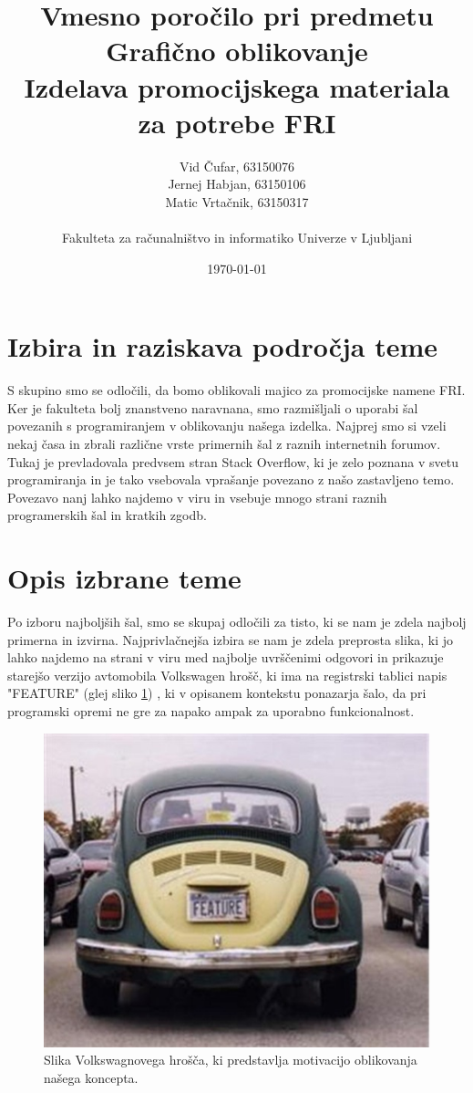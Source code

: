 \documentclass[11pt,a4paper]{article}
\title{Vmesno poročilo pri predmetu Grafično oblikovanje \\
\large Izdelava promocijskega materiala za potrebe FRI}
\author{Vid Čufar, 63150076 \\
Jernej Habjan, 63150106  \\
Matic Vrtačnik, 63150317 \\
\ \\
Fakulteta za računalništvo in informatiko Univerze v Ljubljani
\date{\today}         
}
\begin{document}
\maketitle


\section{Izbira in raziskava področja teme}
S skupino smo se odločili, da bomo oblikovali majico za promocijske namene FRI. Ker je fakulteta bolj znanstveno naravnana, smo razmišljali o uporabi šal povezanih s programiranjem v oblikovanju našega izdelka. Najprej smo si vzeli nekaj časa in zbrali različne vrste primernih šal z raznih internetnih forumov. Tukaj je prevladovala predvsem stran Stack Overflow, ki je zelo poznana v svetu programiranja in je tako vsebovala vprašanje povezano z našo zastavljeno temo. Povezavo nanj lahko najdemo v viru \cite{jokesource} in vsebuje mnogo strani raznih programerskih šal in kratkih zgodb. 


\section{Opis izbrane teme}
Po izboru najboljših šal, smo se skupaj odločili za tisto, ki se nam je zdela najbolj primerna in izvirna. Najprivlačnejša izbira se nam je zdela preprosta slika, ki jo lahko najdemo na strani v viru \cite{jokesource} med najbolje uvrščenimi odgovori in prikazuje starejšo verzijo avtomobila Volkswagen hrošč, ki ima na registrski tablici napis "FEATURE" (glej sliko \ref{sl:feature}) , ki v opisanem kontekstu ponazarja šalo, da pri programski opremi ne gre za napako ampak za uporabno funkcionalnost. 

\begin{figure}[htb]
\centerline{\includegraphics[scale=0.5]{feature.jpg}}
\caption{Slika Volkswagnovega hrošča, ki predstavlja motivacijo oblikovanja našega koncepta.}
\label{sl:feature}
\end{figure}
\end{document}
